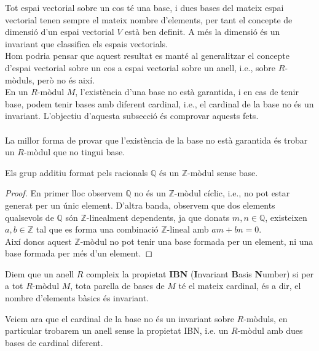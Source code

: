 Tot espai vectorial sobre un cos té una base, i dues bases del mateix espai vectorial tenen sempre el mateix nombre d'elements, per tant el concepte de dimensió d'un espai vectorial $V$ està ben definit. A més la dimensió és un invariant que classifica els espais vectorials. \\
Hom podria pensar que aquest resultat es manté al generalitzar el concepte d'espai vectorial sobre un cos a espai vectorial sobre un anell, i.e., sobre $R$-mòduls, però no és així.\\
\indent En un $R$-mòdul $M$, l'existència d'una base no està garantida, i en cas de tenir base, podem tenir bases amb diferent cardinal, i.e., el cardinal de la base no és un invariant. L'objectiu d'aquesta subsecció és comprovar aquests fets.
\\\\
\indent La millor forma de provar que l'existència de la base no està garantida és trobar un $R$-mòdul que no tingui base.
\begin{prop}
Els grup additiu format pels racionals $\mathbb{Q}$ és un $\mathbb{Z}$-mòdul sense base.
\end{prop}
\begin{proof}
En primer lloc observem $\mathbb{Q}$ no és un $\mathbb{Z}$-mòdul cíclic, i.e., no pot estar generat per un únic element. D'altra banda, observem que dos elements qualsevols de $\mathbb{Q}$ són $\mathbb{Z}$-linealment dependents, ja que donats $m,n\in \mathbb{Q}$, existeixen $a,b\in \mathbb{Z}$ tal que es forma una combinació $\mathbb{Z}$-lineal amb $am+bn=0$. \\
Així doncs aquest $\mathbb{Z}$-mòdul no pot tenir una base formada per un element, ni una base formada per més d'un element.
\end{proof}

\begin{definition}
Diem que un anell $R$ compleix la propietat \textbf{IBN} (\textbf{I}nvariant \textbf{B}asis \textbf{N}umber) si per a tot $R$-mòdul $M$, tota parella de bases de $M$ té el mateix cardinal, és a dir, el nombre d'elements bàsics és invariant.
\end{definition}

Veiem ara que el cardinal de la base no és un invariant sobre $R$-mòduls, en particular trobarem un anell sense la propietat IBN, i.e. un $R$-mòdul amb dues bases de cardinal diferent.

